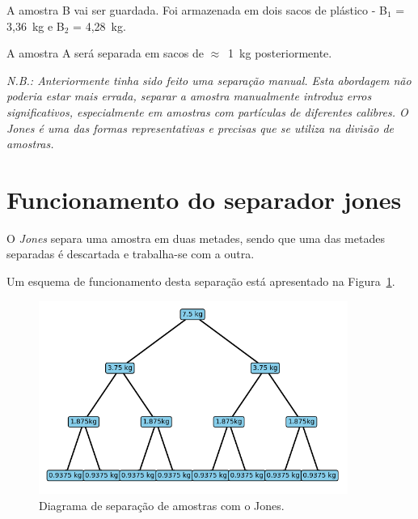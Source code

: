 \documentclass[a4paper]{tufte-handout}
\begin{document}
A amostra B vai ser guardada.
Foi armazenada em dois sacos de plástico - B$_1$ = 3,36~kg e B$_2$ = 4,28~kg.

A amostra A será separada em sacos de $\approx$~1~kg posteriormente.

\hrulefill

\pagebreak


\textit{N.B.: Anteriormente tinha sido feito uma separação manual. Esta abordagem não poderia estar mais errada, separar a amostra manualmente introduz erros significativos, especialmente em amostras com partículas de diferentes calibres. O Jones é uma das formas representativas e precisas que se utiliza na divisão de amostras.}

\section*{Funcionamento do separador jones} 

O \emph{Jones} separa uma amostra em duas metades, sendo que uma das metades separadas é descartada e trabalha-se com a outra. 

Um esquema de funcionamento desta separação está apresentado na Figura~\ref{fig:diagrama_jones}.

\begin{figure}[!ht]
\centering
\includegraphics[width=0.9\textwidth]{figures/diagrama_jones.png}
\caption{Diagrama de separação de amostras com o Jones.}
\label{fig:diagrama_jones}
\end{figure}

\hrulefill


\end{document}
